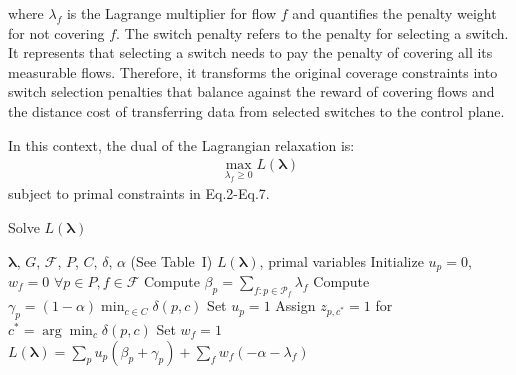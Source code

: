 \noindent where $\lambda_f$ is the Lagrange multiplier for flow $f$ and quantifies the penalty weight for not covering $f$. The switch penalty refers to the penalty for selecting a switch. It represents that selecting a switch needs to pay the penalty of covering all its measurable flows. Therefore, it transforms the original coverage constraints into switch selection penalties that balance against the reward of covering flows and the distance cost of transferring data from selected switches to the control plane. 

In this context, the dual of the Lagrangian relaxation is:
\begin{align}
\max_{\lambda_f \geq 0} L(\boldsymbol{\lambda}) 
\end{align}
subject to primal constraints in Eq.2-Eq.7. 

\begin{algorithm}[t]
\caption{Solve \( L(\boldsymbol{\lambda}) \)}
\label{alg:solve-lagrangian}
\begin{algorithmic}[1]
\footnotesize
\Require \(\boldsymbol{\lambda}\), \(G\), \(\mathcal{F}\), \(P\), \(C\), \(\delta\), \(\alpha\) (See Table~I)
\Ensure \(L(\boldsymbol{\lambda})\), primal variables
\State Initialize \(u_p = 0\), \(w_f = 0\) \(\forall p \in P, f \in \mathcal{F}\)
  \State Compute \(\beta_p = \sum_{f: p \in \mathcal{P}_f} \lambda_f\) 
  \State Compute \(\gamma_p = (1-\alpha) \min_{c \in C} \delta(p, c)\) 
   
    \State Set \(u_p = 1\)
    \State Assign \(z_{p,c^*} = 1\) for \(c^* = \arg\min_c \delta(p,c)\)
  \EndIf
\EndFor
{}
    \State Set \(w_f = 1\) 
  \EndIf
\EndFor
\State \Return \(L(\boldsymbol{\lambda}) = \sum_p u_p (\beta_p + \gamma_p) + \sum_f w_f (-\alpha - \lambda_f)\)
\end{algorithmic}
\end{algorithm}

